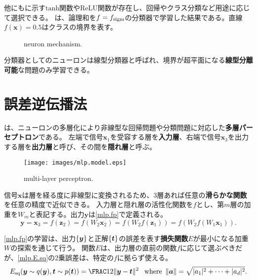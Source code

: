 \documentclass[10pt,a4paper]{book}
\begin{document}
他にもに示す$\mathrm{tanh}$関数やReLU関数が存在し、回帰やクラス分類など用途に応じて選択できる。
は、論理和を$f=f_\mathrm{sigm}$の分類器で学習した結果である。直線$f(\bm{x})\!=\!0.5$はクラスの境界を表す。

\begin{figure}[h]
\centering
{}
\caption{neuron mechanism.\label{fig:slp}}
\end{figure}

分類器としてのニューロンは線型分類器と呼ばれ、境界が超平面になる\textbf{線型分離可能}な問題のみ学習できる。

\section{誤差逆伝播法\label{sect:nn.mlp}}

は、ニューロンの多層化により非線型な回帰問題や分類問題に対応した\textbf{多層パーセプトロン}である。
左端で信号$\bm{x}_1$を受容する層を\textbf{入力層}、右端で信号$\bm{x}_3$を出力する層を{\bf 出力層}と呼び、その間を{\bf 隠れ層}と呼ぶ。

\begin{figure}[h]
\centering
\texttt{[image: images/mlp.model.eps]}
\caption{multi-layer perceptron.\label{fig:mlp.model}}
\end{figure}

信号$\bm{x}$は層を経る度に非線型に変換されるため、3層あれば任意の\textbf{滑らかな関数}を任意の精度で近似できる。
入力層と隠れ層の活性化関数を$f$とし、第$m$層の加重を$W_m$と表記する。出力$\bm{y}$は\eqref{mlp.fp}で定義される。
%
\begin{equation}
\label{eq:mlp.fp}
\bm{y} = \bm{x}_3 = f(\bm{z}_2) = f(W_2\bm{x}_2) = f(W_2f(\bm{z}_1)) = f(W_2f(W_1\bm{x}_1)).
\end{equation}

\eqref{mlp.fp}の学習は、出力$\seq{\bm{y}}$と正解$\seq{\bm{t}}$の誤差を表す\textbf{損失関数}$E$が最小になる加重$W$の探索を通じて行う。
関数$E$は、出力層の直前の関数$f$に応じて選ぶべきだが、\eqref{mlp.E.sq}の2乗誤差は、特定の$f$に拠らず使える。
%
\begin{equation}
\label{eq:mlp.E.sq}
\Esq(\bm{y}\sim q(\bm{y}),\bm{t}\sim p(\bm{t})) = \frac{1}{2} \|\bm{y}-\bm{t}\|^2\;\where \|\bm{a}\| = \sqrt{|a_1|^2+\cdots+|a_d|^2}.
\end{equation}
\end{document}
